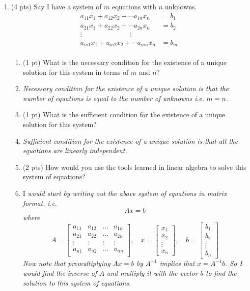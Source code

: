 \documentclass{./../../Latex/tests}
\begin{document}
\begin{enumerate}
\item (4 pts) Say I have a system of $m$ equations with $n$ unknowns. 
\begin{align*}
	a_{11} x_1 + a_{12} x_2 + \cdots a_{1n} x_n &= b_1 \\
	a_{21} x_1 + a_{22} x_2 + \cdots a_{2n} x_n &= b_2 \\
	\vdots \quad \quad \quad \quad \quad \quad \quad \vdots \\
	a_{m1} x_1 + a_{m2} x_2 + \cdots a_{mn} x_n &= b_m \\
\end{align*}
\begin{enumerate}
	\item (1 pt) What is the necessary condition for the existence of a unique solution for this system in terms of $m$ and $n$? 
	\item [] \textit{Necessary condition for the existence of a unique solution is that the number of equations is equal to the number of unknowns i.e. $m=n$. } \\
	\item (1 pt) What is the sufficient condition for the existence of a unique solution for this system? 
	\item [] \textit{Sufficient condition for the existence of a unique solution is that all the equations are linearly independent.} \\
	\item (2 pts) How would you use the tools learned in linear algebra to solve this system of equations? 
	\item [] I \textit{would start by writing out the above system of equations in matrix format, i.e. $$ Ax = b $$
	where }
$$
A = \begin{bmatrix}
a_{11} & a_{12} & \hdots & a_{1n} \\
a_{21} & a_{22} & \hdots & a_{2n} \\
\vdots & \vdots & \vdots & \vdots \\
a_{n1} & a_{n2} & \hdots & a_{nn} \\
\end{bmatrix}, \quad  
x = \begin{bmatrix} x_1 \\x_2 \\ \vdots \\x_n \end{bmatrix} , \quad  
b = \begin{bmatrix} b_1 \\b_2 \\ \vdots \\b_n \end{bmatrix} 
$$
\textit{Now note that premultiplying $Ax = b$ by $A^{-1}$ implies that $x=A^{-1}b$. So I would find the inverse of $A$ and multiply it with the vector $b$ to find the solution to this system of equations.
}
\end{enumerate}


\end{enumerate}
\end{document}
